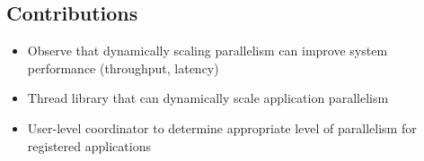\subsection*{Contributions}
\begin{itemize}
  \item Observe that dynamically scaling parallelism can improve system performance (throughput, latency)
  \item Thread library that can dynamically scale application parallelism
  \item User-level coordinator to determine appropriate level of parallelism for registered applications
\end{itemize}
